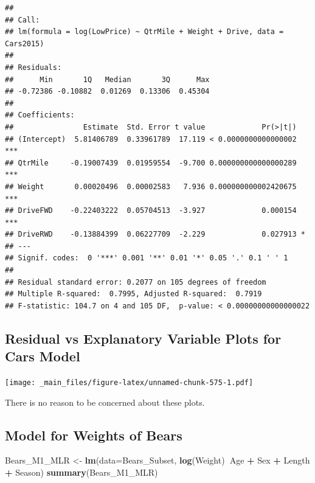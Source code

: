\documentclass[]{book}
\newenvironment{Shaded}{\begin{snugshade}}{\end{snugshade}}
\newcommand{\KeywordTok}[1]{\textcolor[rgb]{0.13,0.29,0.53}{\textbf{#1}}}
\newcommand{\DataTypeTok}[1]{\textcolor[rgb]{0.13,0.29,0.53}{#1}}
\newcommand{\StringTok}[1]{\textcolor[rgb]{0.31,0.60,0.02}{#1}}
\newcommand{\OperatorTok}[1]{\textcolor[rgb]{0.81,0.36,0.00}{\textbf{#1}}}
\newcommand{\NormalTok}[1]{#1}
\begin{document}
\begin{verbatim}
## 
## Call:
## lm(formula = log(LowPrice) ~ QtrMile + Weight + Drive, data = Cars2015)
## 
## Residuals:
##      Min       1Q   Median       3Q      Max 
## -0.72386 -0.10882  0.01269  0.13306  0.45304 
## 
## Coefficients:
##                Estimate  Std. Error t value             Pr(>|t|)    
## (Intercept)  5.81406789  0.33961789  17.119 < 0.0000000000000002 ***
## QtrMile     -0.19007439  0.01959554  -9.700 0.000000000000000289 ***
## Weight       0.00020496  0.00002583   7.936 0.000000000002420675 ***
## DriveFWD    -0.22403222  0.05704513  -3.927             0.000154 ***
## DriveRWD    -0.13884399  0.06227709  -2.229             0.027913 *  
## ---
## Signif. codes:  0 '***' 0.001 '**' 0.01 '*' 0.05 '.' 0.1 ' ' 1
## 
## Residual standard error: 0.2077 on 105 degrees of freedom
## Multiple R-squared:  0.7995, Adjusted R-squared:  0.7919 
## F-statistic: 104.7 on 4 and 105 DF,  p-value: < 0.00000000000000022
\end{verbatim}

\subsection{Residual vs Explanatory Variable Plots for Cars
Model}\label{residual-vs-explanatory-variable-plots-for-cars-model}

\texttt{[image: \_main\_files/figure-latex/unnamed-chunk-575-1.pdf]}

There is no reason to be concerned about these plots.

\subsection{Model for Weights of
Bears}\label{model-for-weights-of-bears}

\begin{Shaded}
\begin{Highlighting}[]
\NormalTok{Bears_M1_MLR <-}\StringTok{ }\KeywordTok{lm}\NormalTok{(}\DataTypeTok{data=}\NormalTok{Bears_Subset, }\KeywordTok{log}\NormalTok{(Weight)}\OperatorTok{~}\NormalTok{Age }\OperatorTok{+}\StringTok{ }\NormalTok{Sex }\OperatorTok{+}\StringTok{ }\NormalTok{Length }\OperatorTok{+}\StringTok{ }\NormalTok{Season)}
\KeywordTok{summary}\NormalTok{(Bears_M1_MLR)}
\end{Highlighting}
\end{Shaded}
\end{document}
